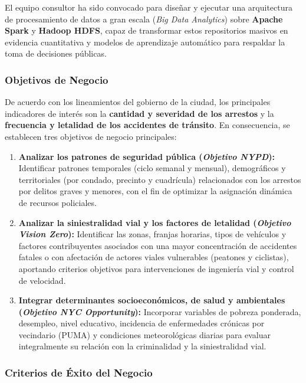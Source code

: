 El equipo consultor ha sido convocado para diseñar y ejecutar una arquitectura de procesamiento de datos a gran escala (\textit{Big Data Analytics}) sobre \textbf{Apache Spark} y \textbf{Hadoop HDFS}, capaz de transformar estos repositorios masivos en evidencia cuantitativa y modelos de aprendizaje automático para respaldar la toma de decisiones públicas.

\subsubsection{Objetivos de Negocio}

De acuerdo con los lineamientos del gobierno de la ciudad, los principales indicadores de interés son la \textbf{cantidad y severidad de los arrestos} y la \textbf{frecuencia y letalidad de los accidentes de tránsito}. En consecuencia, se establecen tres objetivos de negocio principales:

\begin{enumerate}
    \item \textbf{Analizar los patrones de seguridad pública (\textit{Objetivo NYPD}):} Identificar patrones temporales (ciclo semanal y mensual), demográficos y territoriales (por condado, precinto y cuadrícula) relacionados con los arrestos por delitos graves y menores, con el fin de optimizar la asignación dinámica de recursos policiales.

    \item \textbf{Analizar la siniestralidad vial y los factores de letalidad (\textit{Objetivo Vision Zero}):} Identificar las zonas, franjas horarias, tipos de vehículos y factores contribuyentes asociados con una mayor concentración de accidentes fatales o con afectación de actores viales vulnerables (peatones y ciclistas), aportando criterios objetivos para intervenciones de ingeniería vial y control de velocidad.

    \item \textbf{Integrar determinantes socioeconómicos, de salud y ambientales (\textit{Objetivo NYC Opportunity}):} Incorporar variables de pobreza ponderada, desempleo, nivel educativo, incidencia de enfermedades crónicas por vecindario (PUMA) y condiciones meteorológicas diarias para evaluar integralmente su relación con la criminalidad y la siniestralidad vial.
\end{enumerate}

\subsubsection{Criterios de Éxito del Negocio}

